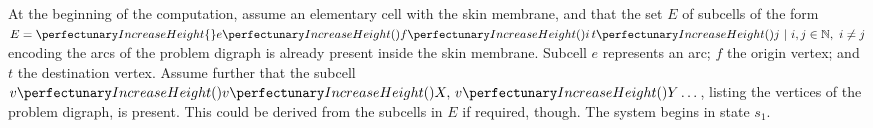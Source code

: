     

    
    
        
    

At the beginning of the computation, assume an elementary cell with the skin membrane, and that the set \(E\) of subcells of the form \(E = \cpset{\cpfunc{e}{\cpfunc{f}{i} \, \cpfunc{t}{j}} ~ | ~ i,j \in \mathbb{N}, ~ i \neq j}\) encoding the arcs of the problem digraph is already present inside the skin membrane.  Subcell \(e\) represents an arc; \(f\) the origin vertex; and \(t\) the destination vertex.  Assume further that the subcell \(\cpfunc{v}{\cpfunc{v}{X}, \, \cpfunc{v}{Y} \dots}\), listing the vertices of the problem digraph, is present.  This could be derived from the subcells in \(E\) if required, though.  The system begins in state \(s_1\).


